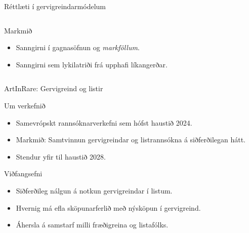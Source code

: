 \documentclass[
    NAME={Dr. Helga Ingimundardóttir},
    EMAIL={helgaingim@hi.is},
    FACULTY={Iðnaðarverkfræðideild},
    TITLE={Spáum fyrir um framtíð gervigreindar},
    SUBTITLE={út frá akademísku sjónarmiði},
    SEMINAR={Stjórnvísi},
    DATE={22. febrúar 2025},
    WIDE=true,
    ICELANDIC=true
]{HI-LaTeX/hi-beamer}
\begin{document}
\begin{frame}{Réttlæti í gervigreindarmódelum}
\begin{columns}
\begin{column}{0.6\linewidth}
    \begin{block}{Markmið}
        \begin{itemize}
            \item Sanngirni í gagnasöfnun og \emph{markföllum}.
            \item Sanngirni sem lykilatriði frá upphafi líkangerðar.
        \end{itemize}
    \end{block}
\end{column}
\end{columns}
\end{frame}

\begin{frame}{ArtInRare: Gervigreind og listir}
    \begin{block}{Um verkefnið}
        \begin{itemize}
            \item Samevrópskt rannsóknarverkefni sem hófst haustið 2024.
            \item Markmið: Samtvinnun gervigreindar og listrannsókna á siðferðilegan hátt.
            \item Stendur yfir til haustið 2028.
        \end{itemize}
    \end{block}
    \begin{block}{Viðfangsefni}
        \begin{itemize}
            \item Siðferðileg nálgun á notkun gervigreindar í listum.
            \item Hvernig má efla sköpunarferlið með nýsköpun í gervigreind.
            \item Áhersla á samstarf milli fræðigreina og listafólks.
        \end{itemize}
    \end{block}
\end{frame}
\end{document}
